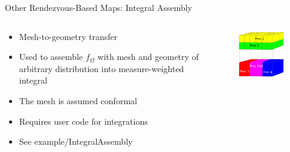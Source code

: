 \documentclass{beamer}
\begin{document}
\begin{frame}{Other Rendezvous-Based Maps: Integral Assembly}

  \begin{columns}
    
    \begin{column}{0.4\textwidth}
      \begin{itemize}
      \item Mesh-to-geometry transfer
        \medskip
      \item Used to assemble $f_{\Omega}$ with mesh and geometry of
        arbitrary distribution into measure-weighted integral
        \medskip
      \item The mesh is assumed conformal
        \medskip
      \item Requires user code for integrations
        \medskip
      \item See example/IntegralAssembly
      \end{itemize}
    \end{column}

    \begin{column}{0.6\textwidth}
      \begin{figure}
      \centering
      \includegraphics[width=2.5in]{integral_assembly.png}
      \end{figure}
    \end{column}

  \end{columns}

\end{frame}
\end{document}
